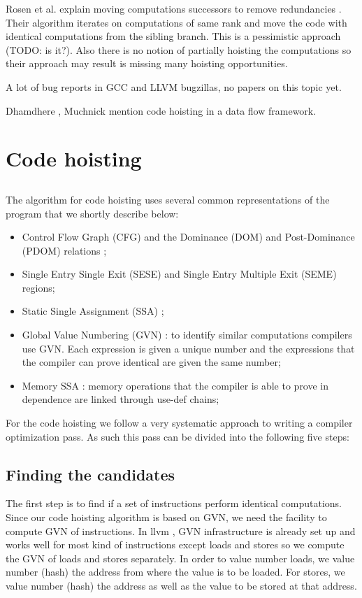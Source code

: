 \documentclass{sig-alternate}
\begin{document}
Rosen et al. explain moving computations successors to remove redundancies
\cite{rosen1988global}. Their algorithm iterates on computations of same rank
and move the code with identical computations from the sibling branch. This is a
pessimistic approach (TODO: is it?). Also there is no notion of partially
hoisting the computations so their approach may result is missing many hoisting
opportunities.

A lot of bug reports in GCC and LLVM bugzillas, no papers on this topic yet.

Dhamdhere \cite{dhamdhere1988fast}, Muchnick \cite{steven1997advanced} mention
code hoisting in a data flow framework.


\newpage

\section{Code hoisting}

\subsection{}
The algorithm for code hoisting uses several common representations of the
program that we shortly describe below:
\begin{itemize}
\item Control Flow Graph (CFG) and the Dominance (DOM) and Post-Dominance (PDOM)
  relations \cite{dragonbook};
\item Single Entry Single Exit (SESE) \cite{sese} and Single Entry Multiple Exit
  (SEME) regions;
\item Static Single Assignment (SSA) \cite{cytron};
\item Global Value Numbering (GVN) \cite{rosen1988global,click1995global}: to
  identify similar computations compilers use GVN.  Each expression is given a
  unique number and the expressions that the compiler can prove identical are
  given the same number;
\item Memory SSA \cite{novillo2007memory}: memory operations that the compiler
  is able to prove in dependence are linked through use-def chains;
\end{itemize}


For the code hoisting we follow a very systematic approach to writing a compiler
optimization pass. As such this pass can be divided into the following five
steps:

\subsection{Finding the candidates}
The first step is to find if a set of instructions perform identical
computations. Since our code hoisting algorithm is based on GVN, we need the
facility to compute GVN of instructions.  In llvm \cite{llvm}, GVN
infrastructure is already set up and works well for most kind of instructions
except loads and stores so we compute the GVN of loads and stores separately. In
order to value number loads, we value number (hash) the address from where the
value is to be loaded. For stores, we value number (hash) the address as well as
the value to be stored at that address.
\end{document}
